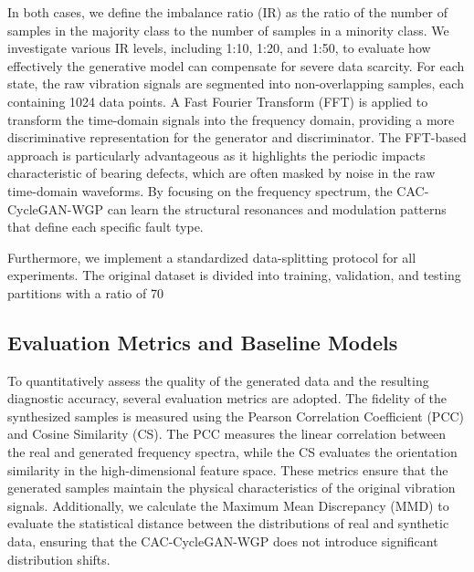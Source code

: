 \documentclass[conference,twocolumn]{IEEEtran}
\begin{document}
In both cases, we define the imbalance ratio (IR) as the ratio of the number of samples in the majority class to the number of samples in a minority class. We investigate various IR levels, including 1:10, 1:20, and 1:50, to evaluate how effectively the generative model can compensate for severe data scarcity. For each state, the raw vibration signals are segmented into non-overlapping samples, each containing 1024 data points. A Fast Fourier Transform (FFT) is applied to transform the time-domain signals into the frequency domain, providing a more discriminative representation for the generator and discriminator. The FFT-based approach is particularly advantageous as it highlights the periodic impacts characteristic of bearing defects, which are often masked by noise in the raw time-domain waveforms. By focusing on the frequency spectrum, the CAC-CycleGAN-WGP can learn the structural resonances and modulation patterns that define each specific fault type.

Furthermore, we implement a standardized data-splitting protocol for all experiments. The original dataset is divided into training, validation, and testing partitions with a ratio of 70%

\subsection{Evaluation Metrics and Baseline Models}
To quantitatively assess the quality of the generated data and the resulting diagnostic accuracy, several evaluation metrics are adopted. 
The fidelity of the synthesized samples is measured using the Pearson Correlation Coefficient (PCC) and Cosine Similarity (CS). The PCC measures the linear correlation between the real and generated frequency spectra, while the CS evaluates the orientation similarity in the high-dimensional feature space. These metrics ensure that the generated samples maintain the physical characteristics of the original vibration signals. Additionally, we calculate the Maximum Mean Discrepancy (MMD) to evaluate the statistical distance between the distributions of real and synthetic data, ensuring that the CAC-CycleGAN-WGP does not introduce significant distribution shifts.
\end{document}
